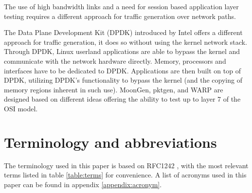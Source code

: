 The use of high bandwidth links and a need for session based application layer testing requires a different approach for traffic generation over network paths.

The Data Plane Development Kit\cite{dpdk} (DPDK) introduced by Intel offers a different approach for traffic generation, it does so without using the kernel network stack.  
Through DPDK, Linux userland applications are able to bypass the kernel and communicate with the network hardware directly. Memory, processors and interfaces have to be dedicated to DPDK.
Applications are then built on top of DPDK, utilizing DPDK's functionality to bypass the kernel (and the copying of memory regions inherent in such use). 
MoonGen\cite{moongen}, pktgen\cite{pktgen-dpdk}, and WARP\cite{warp} are designed based on different ideas offering the ability to test up to layer 7 of the OSI model.


\section{Terminology and abbreviations}\label{sec:terminology}
The terminology used in this paper is based on RFC1242 \cite{rfc1242}, with the most relevant terms listed in table \ref{table:terms} for convenience.
A list of acronyms used in this paper can be found in appendix \ref{appendix:acronym}.

